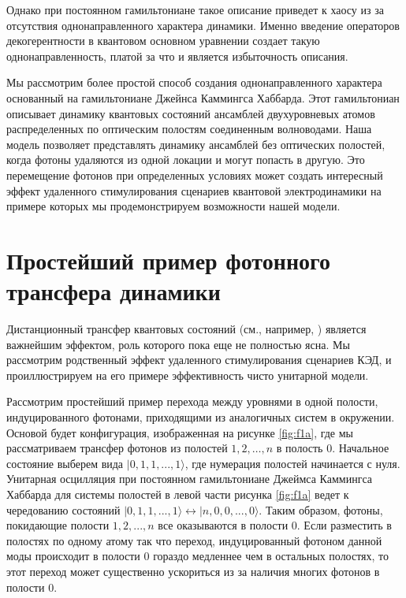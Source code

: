 \documentclass[12pt]{article}
\begin{document}
Однако при постоянном гамильтониане такое описание приведет к хаосу из за отсутствия однонаправленного характера динамики. Именно введение операторов декогерентности в квантовом основном уравнении создает такую однонаправленность, платой за что и является избыточность описания. 

Мы рассмотрим более простой способ создания однонаправленного характера основанный на  гамильтониане Джейнса Каммингса Хаббарда. Этот гамильтониан описывает динамику квантовых состояний ансамблей двухуровневых атомов распределенных по оптическим полостям соединенным волноводами. Наша модель позволяет представлять динамику ансамблей без оптических полостей, когда фотоны удаляются из одной локации и могут попасть в другую. Это перемещение фотонов при определенных условиях может создать интересный эффект удаленного стимулирования сценариев квантовой электродинамики на примере которых мы продемонстрируем возможности нашей модели. 



 


\section{Простейший пример фотонного трансфера динамики }

Дистанционный трансфер квантовых состояний (см., например, \cite{transfer}) является важнейшим эффектом, роль которого пока еще не полностью ясна. Мы рассмотрим родственный эффект удаленного стимулирования сценариев КЭД, и проиллюстрируем на его примере эффективность чисто унитарной модели.


Рассмотрим простейший пример перехода между уровнями в одной полости, индуцированного фотонами, приходящими из аналогичных систем в окружении. Основой будет конфигурация, изображенная на рисунке \ref{fig:f1a}, где мы рассматриваем трансфер фотонов из полостей $1, 2, … , n$ в полость $0$. Начальное состояние выберем вида $|0,1,1,...,1\rangle$, где нумерация полостей начинается с нуля. Унитарная осцилляция при постоянном гамильтониане Джеймса Каммингса Хаббарда для системы полостей в левой части рисунка \ref{fig:f1a} ведет к чередованию состояний $|0,1,1,...,1\rangle\leftrightarrow |n,0,0,...,0\rangle$. Таким образом, фотоны, покидающие полости $1,2,...,n$ все оказываются в полости $0$. Если разместить в полостях по одному атому так что переход, индуцированный фотоном данной моды происходит в полости $0$ гораздо медленнее чем в остальных полостях, то этот переход может существенно ускориться из за наличия многих фотонов в полости $0$. 
\end{document}
